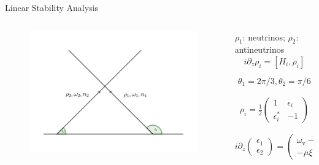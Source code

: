 \documentclass[9pt]{beamer}
\begin{document}
\begin{darkframes}
\begin{frame}{Linear Stability Analysis}
\begin{columns}[T]
      \begin{column}{0.55\textwidth}
      \begin{figure}
         \includegraphics[width=\textwidth]{assets/two-beams-model-sym}
      \end{figure}
      \end{column}

\begin{column}{0.45\textwidth}

$\rho_1$: neutrinos; \newline
$\rho_2$: antineutrinos
   \begin{equation*}
   i \partial_z \rho_i = \left[ H_i, \rho_i \right]
   \end{equation*}

   \begin{equation*}
   \theta_1 =  2\pi/3, \theta_2 = \pi/6
   \end{equation*}

\pause

   \begin{align*}
      \rho_i = \frac{1}{2}\begin{pmatrix}
      1 & \epsilon_i\\
      \epsilon_i^* & -1
      \end{pmatrix}
   \end{align*}

\pause

\small
\begin{equation*}
i\partial_{z}\begin{pmatrix}
\epsilon_1 \\
\epsilon_2
\end{pmatrix} = \begin{pmatrix}
\omega_{\mathrm v} - \mu \xi &  \mu  \xi \\
-\mu \xi & -\omega_{\mathrm v} + \mu  \xi
\end{pmatrix}\begin{pmatrix}
\epsilon_1 \\
\epsilon_2
\end{pmatrix}
\end{equation*}



\end{column}
\end{columns}
\end{frame}
\end{darkframes}
\end{document}
